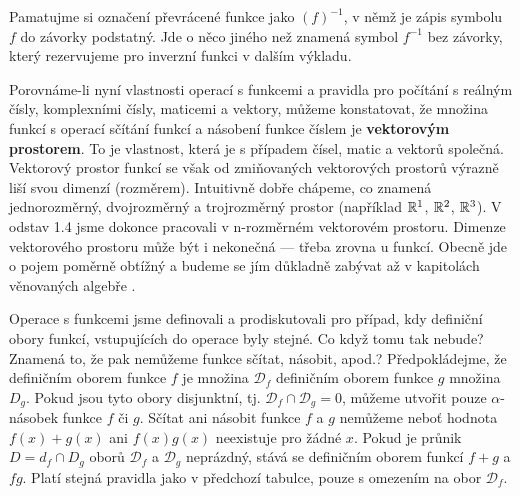 {      \begin{note}
        Pamatujme si označení převrácené funkce jako \((f)^{-1}\), v němž je zápis symbolu \(f\) do 
        závorky podstatný. Jde o něco jiného než znamená symbol \(f^{-1}\) bez závorky, který 
        rezervujeme pro inverzní funkci v dalším výkladu.
      \end{note}
      \begin{note}
        Porovnáme-li nyní vlastnosti operací s funkcemi a pravidla pro počítání s reálným čísly, 
        komplexními čísly, maticemi a vektory, můžeme konstatovat, že množina funkcí s operací 
        sčítání funkcí a násobení funkce číslem je \textbf{vektorovým prostorem}. To je vlastnost, 
        která je s případem čísel, matic a vektorů společná. Vektorový prostor funkcí se však od 
        zmiňovaných vektorových prostorů výrazně liší svou dimenzí (rozměrem). Intuitivně dobře 
        chápeme, co znamená jednorozměrný, dvojrozměrný a trojrozměrný prostor (například 
        \(\mathbb{R}^1\), \(\mathbb{R}^2\), \(\mathbb{R}^3\)). V odstav 1.4 jsme dokonce pracovali v 
        n-rozměrném vektorovém prostoru. Dimenze vektorového prostoru může být i nekonečná — třeba 
        zrovna u funkcí. Obecně jde o pojem poměrně obtížný a budeme se jím důkladně zabývat až v 
        kapitolách věnovaných algebře \cite[s.~58]{Musilova2009MA1}.
      \end{note}
      
      Operace s funkcemi jsme definovali a prodiskutovali pro případ, kdy definiční obory funkcí, 
      vstupujících do operace byly stejné. Co když tomu tak nebude? Znamená to, že pak nemůžeme 
      funkce sčítat, násobit, apod.? Předpokládejme, že definičním oborem funkce \(f\) je množina 
      \(\mathcal{D}_f\) definičním oborem funkce \(g\) množina \(D_g\). Pokud jsou tyto obory 
      disjunktní, tj. \(\mathcal{D}_f \cap \mathcal{D}_g = 0\), můžeme utvořit pouze 
      \(\alpha\)-násobek funkce \(f\) či \(g\). Sčítat ani násobit funkce \(f\) a \(g\) nemůžeme 
      neboť hodnota \(f(x) + g(x)\) ani \(f(x)g(x)\) neexistuje pro žádné \(x\). Pokud je průnik 
      \(D=d_f\cap D_g\) oborů \(\mathcal{D}_f\) a \(\mathcal{D}_g\) neprázdný, stává se definičním 
      oborem funkcí \(f+g\) a \(fg\). Platí stejná pravidla jako v předchozí tabulce, pouze s 
      omezením na obor \(\mathcal{D}_f\).
    
}

